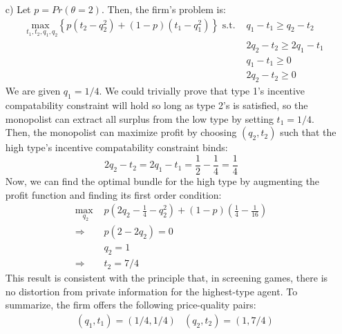 \documentclass{article}
\newcommand{\usmax}[1]{\underset{#1}{\text{max }}}
\begin{document}
\begin{itemize}
	
	\item[c)] Let ${p=Pr(\theta=2)}$. Then, the firm's problem is:
		\begin{align*}
			&\usmax{t_1,t_2,q_1,q_2}\left\{p(t_2 - q_2^2)+(1-p)(t_1- q_1^2)\right\}\text{ s.t. } 	
				& q_1-t_1 	\geq q_2-t_2		\\
			&	& 2q_2-t_2	\geq 2q_1-t_1	\\
			&	& q_1 - t_1 	\geq 0			\\
			&	& 2q_2 - t_2 	\geq 0
		\end{align*}
		We are given $q_1=1/4$. We could trivially prove that type 1's incentive compatability constraint will hold so long as type 2's is satisfied, so the monopolist can extract all surplus from the low type by setting ${t_1=1/4}$. Then, the monopolist can maximize profit by choosing ${(q_2,t_2)}$ such that the high type's incentive compatability constraint binds:
		\[
			2q_2 - t_2 = 2q_1 - t_1 = \frac{1}{2} - \frac{1}{4} = \frac{1}{4}
		\]
		Now, we can find the optimal bundle for the high type by augmenting the profit function and finding its first order condition:
		\begin{align*}
			\usmax{q_2}	& p\left(2q_2-\frac{1}{4}-q_2^2\right) + (1-p)\left(\frac{1}{4} -\frac{1}{16}\right)	\\
			\Rightarrow	& p\left(2-2q_2\right) = 0	\\
					& q_2 = 1			\\
			\Rightarrow 	& t_2 = 7/4
		\end{align*}
		This result is consistent with the principle that, in screening games, there is no distortion from private information for the highest-type agent. To summarize, the firm offers the following price-quality pairs:
		\begin{align*}
			&(q_1,t_1) = (1/4,1/4)	&(q_2,t_2) = (1,7/4)
		\end{align*}
		
\end{itemize}

\end{document}
